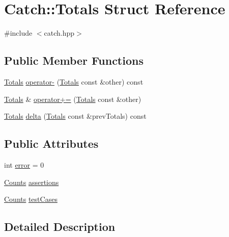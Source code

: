 \hypertarget{struct_catch_1_1_totals}{}\section{Catch\+:\+:Totals Struct Reference}
\label{struct_catch_1_1_totals}


{\ttfamily \#include $<$catch.\+hpp$>$}

\subsection*{Public Member Functions}
\begin{DoxyCompactItemize}
\item 
\mbox{\hyperlink{struct_catch_1_1_totals}{Totals}} \mbox{\hyperlink{struct_catch_1_1_totals_a9279ed39139cb7e7b291918a6d08290e}{operator-\/}} (\mbox{\hyperlink{struct_catch_1_1_totals}{Totals}} const \&other) const
\item 
\mbox{\hyperlink{struct_catch_1_1_totals}{Totals}} \& \mbox{\hyperlink{struct_catch_1_1_totals_a574015076e54cc405c70b053e3356e43}{operator+=}} (\mbox{\hyperlink{struct_catch_1_1_totals}{Totals}} const \&other)
\item 
\mbox{\hyperlink{struct_catch_1_1_totals}{Totals}} \mbox{\hyperlink{struct_catch_1_1_totals_a1a94a654f5f3786b75695e081fc9bca2}{delta}} (\mbox{\hyperlink{struct_catch_1_1_totals}{Totals}} const \&prev\+Totals) const
\end{DoxyCompactItemize}
\subsection*{Public Attributes}
\begin{DoxyCompactItemize}
\item 
int \mbox{\hyperlink{struct_catch_1_1_totals_a6ea14c7de7ea735a14f172a26e08a239}{error}} = 0
\item 
\mbox{\hyperlink{struct_catch_1_1_counts}{Counts}} \mbox{\hyperlink{struct_catch_1_1_totals_a885ded66df752147b30c3d45aa602ec9}{assertions}}
\item 
\mbox{\hyperlink{struct_catch_1_1_counts}{Counts}} \mbox{\hyperlink{struct_catch_1_1_totals_adb195fe477aedee2ecea88c888f16506}{test\+Cases}}
\end{DoxyCompactItemize}


\subsection{Detailed Description}


